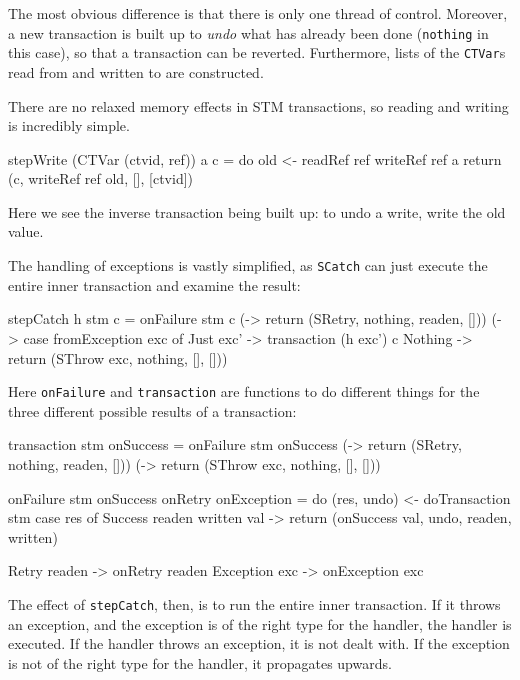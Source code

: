 The most obvious difference is that there is only one thread of
control. Moreover, a new transaction is built up to \emph{undo} what
has already been done (\verb|nothing| in this case), so that a
transaction can be reverted. Furthermore, lists of the \verb|CTVar|s
read from and written to are constructed.

There are no relaxed memory effects in STM transactions, so reading
and writing is incredibly simple.

\begin{haskellcode}
stepWrite (CTVar (ctvid, ref)) a c = do
  old <- readRef ref
  writeRef ref a
  return (c, writeRef ref old, [], [ctvid])
\end{haskellcode}

Here we see the inverse transaction being built up: to undo a write,
write the old value.

The handling of exceptions is vastly simplified, as \verb|SCatch| can
just execute the entire inner transaction and examine the result:

\begin{haskellcode}
stepCatch h stm c = onFailure stm c
  (\readen -> return (SRetry, nothing, readen, []))
  (\exc    -> case fromException exc of
    Just exc' -> transaction (h exc') c
    Nothing   -> return (SThrow exc, nothing, [], []))
\end{haskellcode}

Here \verb|onFailure| and \verb|transaction| are functions to do
different things for the three different possible results of a
transaction:

\begin{haskellcode}
transaction stm onSuccess = onFailure stm onSuccess
  (\readen -> return (SRetry, nothing, readen, []))
  (\exc    -> return (SThrow exc, nothing, [], []))

onFailure stm onSuccess onRetry onException = do
  (res, undo) <- doTransaction stm
  case res of
    Success readen written val -> return
      (onSuccess val, undo, readen, written)

    Retry readen  -> onRetry readen
    Exception exc -> onException exc
\end{haskellcode}

The effect of \verb|stepCatch|, then, is to run the entire inner
transaction. If it throws an exception, and the exception is of the
right type for the handler, the handler is executed. If the handler
throws an exception, it is not dealt with. If the exception is not of
the right type for the handler, it propagates upwards.

